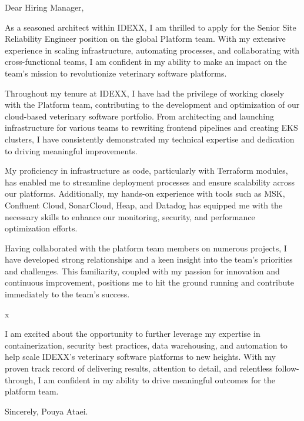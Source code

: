 \documentclass[10pt,a4paper,ragged2e]{altacv}
\begin{document}


\vspace{1em} %

Dear Hiring Manager,

\vspace{1em}

As a seasoned architect within IDEXX, I am thrilled to apply for the Senior Site Reliability Engineer position on the global Platform team. With my extensive experience in scaling infrastructure, automating processes, and collaborating with cross-functional teams, I am confident in my ability to make an impact on the team's mission to revolutionize veterinary software platforms.

\vspace{1em}

Throughout my tenure at IDEXX, I have had the privilege of working closely with the Platform team, contributing to the development and optimization of our cloud-based veterinary software portfolio. From architecting and launching infrastructure for various teams to rewriting frontend pipelines and creating EKS clusters, I have consistently demonstrated my technical expertise and dedication to driving meaningful improvements.

\vspace{1em}

My proficiency in infrastructure as code, particularly with Terraform modules, has enabled me to streamline deployment processes and ensure scalability across our platforms. Additionally, my hands-on experience with tools such as MSK, Confluent Cloud, SonarCloud, Heap, and Datadog has equipped me with the necessary skills to enhance our monitoring, security, and performance optimization efforts.

\vspace{1em}

Having collaborated with the platform team members on numerous projects, I have developed strong relationships and a keen insight into the team's priorities and challenges. This familiarity, coupled with my passion for innovation and continuous improvement, positions me to hit the ground running and contribute immediately to the team's success.

\vspace{1em}x

I am excited about the opportunity to further leverage my expertise in containerization, security best practices, data warehousing, and automation to help scale IDEXX's veterinary software platforms to new heights. With my proven track record of delivering results, attention to detail, and relentless follow-through, I am confident in my ability to drive meaningful outcomes for the platform team.


\vspace{2em} %

Sincerely, \newline
Pouya Ataei.
\end{document}
